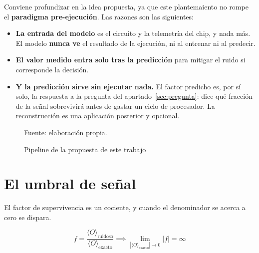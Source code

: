 Conviene profundizar en la idea propuesta, ya que este plantemaiento no rompe el \textbf{paradigma pre-ejecución}. Las razones son las siguientes:

\begin{itemize}
    \item \textbf{La entrada del modelo} es el circuito y la telemetría del chip, y nada más. El modelo \textbf{nunca ve} el resultado de la ejecución, ni al entrenar ni al predecir.
    \item \textbf{El valor medido entra solo tras la predicción} para mitigar el ruido si corresponde la decisión.
    \item \textbf{Y la predicción sirve sin ejecutar nada.} El factor predicho es, por sí solo, la respuesta a la pregunta del apartado~\ref{sec:pregunta}: dice qué fracción de la señal sobrevivirá antes de gastar un ciclo de procesador. La reconstrucción es una aplicación posterior y opcional.
\end{itemize}

\begin{figure}[htbp]
    \centering
    \caption{Pipeline de la propuesta de este trabajo}
    \label{fig:reconstruccion}

    

    {\footnotesize Fuente: elaboración propia.}
\end{figure}


\section{El umbral de señal}
\label{sec:umbral}

El factor de supervivencia es un cociente, y cuando el denominador se acerca a cero se dispara.

\begin{equation}
\label{eq:divergencia_factor}
f = \frac{\langle O \rangle_{\text{ruidoso}}}{\langle O \rangle_{\text{exacto}}} \implies \lim_{|\langle O \rangle_{\text{exacto}}| \to 0} |f| = \infty
\end{equation}

